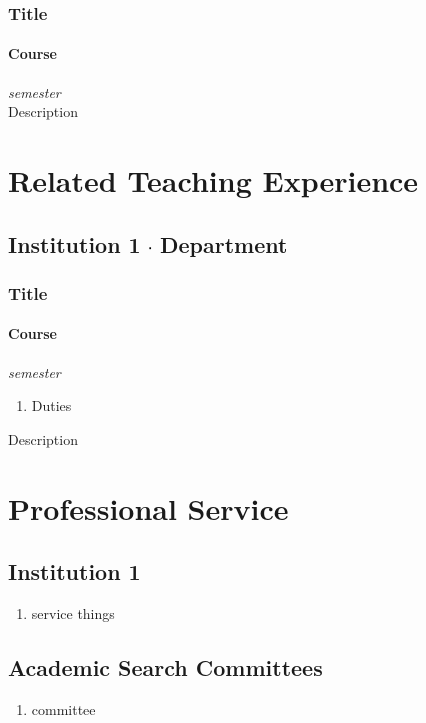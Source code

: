 \documentclass[11pt,letterpaper]{article}
\newcommand*\sq{\mathbin{\vcenter{\hbox{\rule{.3ex}{.3ex}}}}} %
\begin{document}
\subsubsection*{Title}
\paragraph*{Course}\hfill{\textit{semester}}\\
Description


\section*{Related Teaching Experience}
\subsection*{Institution 1 $\sq$ Department}
\subsubsection*{Title}
\paragraph*{Course}\hfill{\textit{semester}}
\begin{enumerate}[leftmargin=*,topsep=0pt,itemsep=-1ex,partopsep=1ex,parsep=1ex,label=(\arabic*)]
    \item[] Duties
\end{enumerate}
Description


\section*{Professional Service}
\subsection*{Institution 1}
\begin{enumerate}[leftmargin=*,topsep=0pt,itemsep=-1ex,partopsep=1ex,parsep=1ex,label=(\arabic*)]
    \item[] service things
\end{enumerate}

\subsection*{Academic Search Committees}
\begin{enumerate}[leftmargin=*,topsep=0pt,itemsep=-1ex,partopsep=1ex,parsep=1ex,label=(\arabic*)]
    \item[] committee
\end{enumerate}
\end{document}
